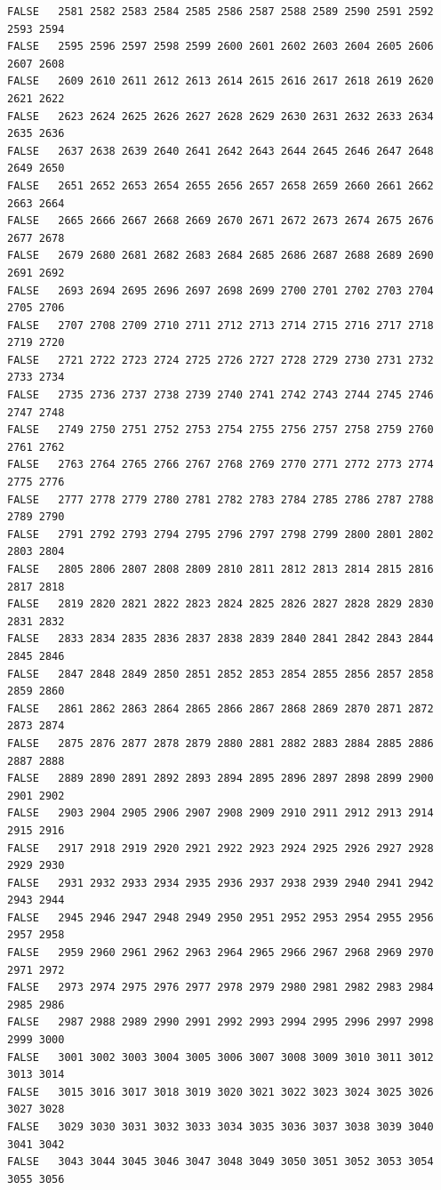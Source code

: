 \documentclass[]{article}
\begin{document}
\begin{verbatim}
FALSE   2581 2582 2583 2584 2585 2586 2587 2588 2589 2590 2591 2592 2593 2594
FALSE   2595 2596 2597 2598 2599 2600 2601 2602 2603 2604 2605 2606 2607 2608
FALSE   2609 2610 2611 2612 2613 2614 2615 2616 2617 2618 2619 2620 2621 2622
FALSE   2623 2624 2625 2626 2627 2628 2629 2630 2631 2632 2633 2634 2635 2636
FALSE   2637 2638 2639 2640 2641 2642 2643 2644 2645 2646 2647 2648 2649 2650
FALSE   2651 2652 2653 2654 2655 2656 2657 2658 2659 2660 2661 2662 2663 2664
FALSE   2665 2666 2667 2668 2669 2670 2671 2672 2673 2674 2675 2676 2677 2678
FALSE   2679 2680 2681 2682 2683 2684 2685 2686 2687 2688 2689 2690 2691 2692
FALSE   2693 2694 2695 2696 2697 2698 2699 2700 2701 2702 2703 2704 2705 2706
FALSE   2707 2708 2709 2710 2711 2712 2713 2714 2715 2716 2717 2718 2719 2720
FALSE   2721 2722 2723 2724 2725 2726 2727 2728 2729 2730 2731 2732 2733 2734
FALSE   2735 2736 2737 2738 2739 2740 2741 2742 2743 2744 2745 2746 2747 2748
FALSE   2749 2750 2751 2752 2753 2754 2755 2756 2757 2758 2759 2760 2761 2762
FALSE   2763 2764 2765 2766 2767 2768 2769 2770 2771 2772 2773 2774 2775 2776
FALSE   2777 2778 2779 2780 2781 2782 2783 2784 2785 2786 2787 2788 2789 2790
FALSE   2791 2792 2793 2794 2795 2796 2797 2798 2799 2800 2801 2802 2803 2804
FALSE   2805 2806 2807 2808 2809 2810 2811 2812 2813 2814 2815 2816 2817 2818
FALSE   2819 2820 2821 2822 2823 2824 2825 2826 2827 2828 2829 2830 2831 2832
FALSE   2833 2834 2835 2836 2837 2838 2839 2840 2841 2842 2843 2844 2845 2846
FALSE   2847 2848 2849 2850 2851 2852 2853 2854 2855 2856 2857 2858 2859 2860
FALSE   2861 2862 2863 2864 2865 2866 2867 2868 2869 2870 2871 2872 2873 2874
FALSE   2875 2876 2877 2878 2879 2880 2881 2882 2883 2884 2885 2886 2887 2888
FALSE   2889 2890 2891 2892 2893 2894 2895 2896 2897 2898 2899 2900 2901 2902
FALSE   2903 2904 2905 2906 2907 2908 2909 2910 2911 2912 2913 2914 2915 2916
FALSE   2917 2918 2919 2920 2921 2922 2923 2924 2925 2926 2927 2928 2929 2930
FALSE   2931 2932 2933 2934 2935 2936 2937 2938 2939 2940 2941 2942 2943 2944
FALSE   2945 2946 2947 2948 2949 2950 2951 2952 2953 2954 2955 2956 2957 2958
FALSE   2959 2960 2961 2962 2963 2964 2965 2966 2967 2968 2969 2970 2971 2972
FALSE   2973 2974 2975 2976 2977 2978 2979 2980 2981 2982 2983 2984 2985 2986
FALSE   2987 2988 2989 2990 2991 2992 2993 2994 2995 2996 2997 2998 2999 3000
FALSE   3001 3002 3003 3004 3005 3006 3007 3008 3009 3010 3011 3012 3013 3014
FALSE   3015 3016 3017 3018 3019 3020 3021 3022 3023 3024 3025 3026 3027 3028
FALSE   3029 3030 3031 3032 3033 3034 3035 3036 3037 3038 3039 3040 3041 3042
FALSE   3043 3044 3045 3046 3047 3048 3049 3050 3051 3052 3053 3054 3055 3056

\end{verbatim}
\end{document}
